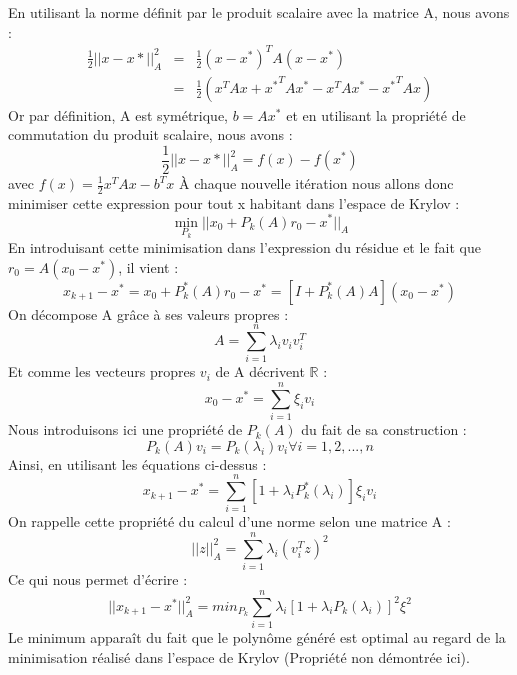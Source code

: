 En utilisant la norme définit par le produit scalaire avec la matrice A, nous avons : 
\begin{eqnarray}
\frac{1}{2} ||x - x*||^2_A &=& \frac{1}{2}(x - x^*)^TA(x - x^*)\\
&=& \frac{1}{2} (x^TAx + {x^*}^TAx^* - x^TAx^* - {x^*}^TAx)
\end{eqnarray}
Or par définition, A est symétrique, $b = Ax^*$ et en utilisant la propriété de commutation du produit scalaire, nous avons : 
\begin{equation}
\frac{1}{2} ||x - x*||^2_A = f(x) - f(x^*)
\end{equation}
avec $f(x) = \frac{1}{2}x^TAx - b^Tx$
À chaque nouvelle itération nous allons donc minimiser cette expression pour tout x habitant dans l'espace de Krylov : 
\begin{equation}
\min_{P_k} ||x_0 + P_k(A)r_0 - x^*||_A
\end{equation}
En introduisant cette minimisation dans l'expression du résidue et le fait que $r_0 = A(x_0 - x^*)$, il vient : 
\begin{equation}
x_{k+1} - x^* = x_0 + P_k^*(A)r_0 - x^* = [I + P_k^*(A)A](x_0 - x^*)
\end{equation}
On décompose A grâce à ses valeurs propres : 
\begin{equation}
A = \sum_{i = 1}^{n} \lambda_i v_i v_i^T
\end{equation}
Et comme les vecteurs propres $v_i$ de A décrivent $\mathbb{R}$ : 
\begin{equation}
x_0 - x^* = \sum^n_{i = 1} \xi_iv_i
\end{equation}
Nous introduisons ici une propriété de $P_k(A)$ du fait de sa construction : 
\begin{equation}
P_k(A)v_i = P_k(\lambda_i)v_i \forall i = 1, 2, ..., n
\end{equation}
Ainsi, en utilisant les équations ci-dessus : 
\begin{equation}
x_{k+1} - x^* = \sum_{i = 1}^{n} [1 + \lambda_i P_k^*(\lambda_i)]\xi_iv_i
\end{equation}
On rappelle cette propriété du calcul d'une norme selon une matrice A : 
$$||z||^2_A = \sum_{i=1}^{n}\lambda_i(v_i^Tz)^2$$
Ce qui nous permet d'écrire : 
\begin{equation}
||x_{k+1} - x^*||^2_A = min_{P_k} \sum_{i = 1}^{n} \lambda_i[1 + \lambda_iP_k(\lambda_i)]^2\xi^2
\end{equation}
Le minimum apparaît du fait que le polynôme généré est optimal au regard de la minimisation réalisé dans l'espace de Krylov (Propriété non démontrée ici).

